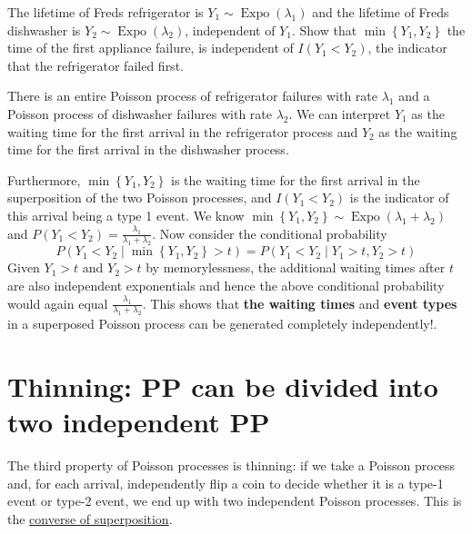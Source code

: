 \documentclass[11pt]{elegantbook}
\begin{document}
\begin{example}
The lifetime of Freds refrigerator is $Y_1 \sim \operatorname{Expo}\left(\lambda_1\right)$ and the lifetime of Freds dishwasher is $Y_2 \sim \operatorname{Expo}\left(\lambda_2\right)$, independent of $Y_1$. Show that $\min \left\{Y_1, Y_2\right\}$ the time of the first appliance failure, is independent of $I\left(Y_1<Y_2\right)$, the indicator that the refrigerator failed first.

\begin{solution}
    There is an entire Poisson process of refrigerator failures with rate $\lambda_1$ and a Poisson process of dishwasher failures with rate $\lambda_2$. We can interpret $Y_1$ as the waiting time for the first arrival in the refrigerator process and $Y_2$ as the waiting time for the first arrival in the dishwasher process.

    Furthermore, $\min \left\{Y_1, Y_2\right\}$ is the waiting time for the first arrival in the superposition of the two Poisson processes, and $I\left(Y_1<Y_2\right)$ is the indicator of this arrival being a type 1 event. We know $\min \left\{Y_1, Y_2\right\} \sim \operatorname{Expo}\left(\lambda_1+\lambda_2\right)$ and $P\left(Y_1<Y_2\right)=\frac{\lambda_1}{\lambda_1+\lambda_2}$. Now consider the conditional probability
    $$
    P\left(Y_1<Y_2 \mid \min \left\{Y_1, Y_2\right\}>t\right)=P\left(Y_1<Y_2 \mid Y_1>t, Y_2>t\right)
    $$
    Given $Y_1>t$ and $Y_2>t$ by memorylessness, the additional waiting times after $t$ are also independent exponentials and hence the above conditional probability would again equal $\frac{\lambda_1}{\lambda_1+\lambda_2}$. This shows that \textbf{the waiting times} and \textbf{event types} in a superposed Poisson process can be generated completely independently!.
\end{solution}
\end{example}

\section{Thinning: PP can be divided into two independent PP}
The third property of Poisson processes is thinning: if we take a Poisson process and, for each arrival, independently flip a coin to decide whether it is a type-1 event or type-2 event, we end up with two independent Poisson processes. This is the \underline{converse of superposition}.
\end{document}
